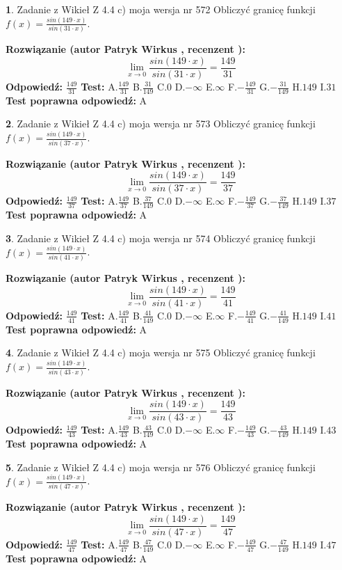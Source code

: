\documentclass[12pt, a4paper]{article}
\theoremstyle{definition} %
\newtheorem{zad}{}
\newcommand{\zadStart}[1]{\begin{zad}#1\newline}
\newcommand{\zadStop}{\end{zad}}
\newcommand{\rozwStart}[2]{\noindent \textbf{Rozwiązanie (autor #1 , recenzent #2): }\newline}
\newcommand{\rozwStop}{\newline}
\newcommand{\odpStart}{\noindent \textbf{Odpowiedź:}\newline}
\newcommand{\odpStop}{\newline}
\newcommand{\testStart}{\noindent \textbf{Test:}\newline}
\newcommand{\testStop}{\newline}
\newcommand{\kluczStart}{\noindent \textbf{Test poprawna odpowiedź:}\newline}
\newcommand{\kluczStop}{\newline}
\begin{document}
\zadStart{Zadanie z Wikieł Z 4.4 c) moja wersja nr 572}
Obliczyć granicę funkcji $f(x)=\frac{sin(149\cdot x)}{sin(31\cdot x)}$.
\zadStop
\rozwStart{Patryk Wirkus}{}
$$\lim\limits_{x\to 0}\frac{sin(149\cdot x)}{sin(31\cdot x)}=
\frac{149}{31}$$
\rozwStop
\odpStart
$\frac{149}{31}$
\odpStop
\testStart
A.$\frac{149}{31}$
B.$\frac{31}{149}$
C.$0$
D.$-\infty$
E.$\infty$
F.$-\frac{149}{31}$
G.$-\frac{31}{149}$
H.$149$
I.$31$
\testStop
\kluczStart
A
\kluczStop



\zadStart{Zadanie z Wikieł Z 4.4 c) moja wersja nr 573}
Obliczyć granicę funkcji $f(x)=\frac{sin(149\cdot x)}{sin(37\cdot x)}$.
\zadStop
\rozwStart{Patryk Wirkus}{}
$$\lim\limits_{x\to 0}\frac{sin(149\cdot x)}{sin(37\cdot x)}=
\frac{149}{37}$$
\rozwStop
\odpStart
$\frac{149}{37}$
\odpStop
\testStart
A.$\frac{149}{37}$
B.$\frac{37}{149}$
C.$0$
D.$-\infty$
E.$\infty$
F.$-\frac{149}{37}$
G.$-\frac{37}{149}$
H.$149$
I.$37$
\testStop
\kluczStart
A
\kluczStop



\zadStart{Zadanie z Wikieł Z 4.4 c) moja wersja nr 574}
Obliczyć granicę funkcji $f(x)=\frac{sin(149\cdot x)}{sin(41\cdot x)}$.
\zadStop
\rozwStart{Patryk Wirkus}{}
$$\lim\limits_{x\to 0}\frac{sin(149\cdot x)}{sin(41\cdot x)}=
\frac{149}{41}$$
\rozwStop
\odpStart
$\frac{149}{41}$
\odpStop
\testStart
A.$\frac{149}{41}$
B.$\frac{41}{149}$
C.$0$
D.$-\infty$
E.$\infty$
F.$-\frac{149}{41}$
G.$-\frac{41}{149}$
H.$149$
I.$41$
\testStop
\kluczStart
A
\kluczStop



\zadStart{Zadanie z Wikieł Z 4.4 c) moja wersja nr 575}
Obliczyć granicę funkcji $f(x)=\frac{sin(149\cdot x)}{sin(43\cdot x)}$.
\zadStop
\rozwStart{Patryk Wirkus}{}
$$\lim\limits_{x\to 0}\frac{sin(149\cdot x)}{sin(43\cdot x)}=
\frac{149}{43}$$
\rozwStop
\odpStart
$\frac{149}{43}$
\odpStop
\testStart
A.$\frac{149}{43}$
B.$\frac{43}{149}$
C.$0$
D.$-\infty$
E.$\infty$
F.$-\frac{149}{43}$
G.$-\frac{43}{149}$
H.$149$
I.$43$
\testStop
\kluczStart
A
\kluczStop



\zadStart{Zadanie z Wikieł Z 4.4 c) moja wersja nr 576}
Obliczyć granicę funkcji $f(x)=\frac{sin(149\cdot x)}{sin(47\cdot x)}$.
\zadStop
\rozwStart{Patryk Wirkus}{}
$$\lim\limits_{x\to 0}\frac{sin(149\cdot x)}{sin(47\cdot x)}=
\frac{149}{47}$$
\rozwStop
\odpStart
$\frac{149}{47}$
\odpStop
\testStart
A.$\frac{149}{47}$
B.$\frac{47}{149}$
C.$0$
D.$-\infty$
E.$\infty$
F.$-\frac{149}{47}$
G.$-\frac{47}{149}$
H.$149$
I.$47$
\testStop
\kluczStart
A
\kluczStop
\end{document}
